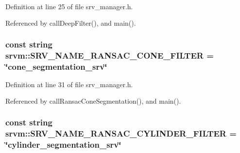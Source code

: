 Definition at line 25 of file srv\-\_\-manager.\-h.



Referenced by call\-Deep\-Filter(), and main().

\hypertarget{namespacesrvm_af2812968f812d475d50a80635965779d}{
\subsubsection[{S\-R\-V\-\_\-\-N\-A\-M\-E\-\_\-\-R\-A\-N\-S\-A\-C\-\_\-\-C\-O\-N\-E\-\_\-\-F\-I\-L\-T\-E\-R}]{\setlength{\rightskip}{0pt plus 5cm}const string srvm\-::\-S\-R\-V\-\_\-\-N\-A\-M\-E\-\_\-\-R\-A\-N\-S\-A\-C\-\_\-\-C\-O\-N\-E\-\_\-\-F\-I\-L\-T\-E\-R = \char`\"{}cone\-\_\-segmentation\-\_\-srv\char`\"{}}}\label{namespacesrvm_af2812968f812d475d50a80635965779d}


Definition at line 31 of file srv\-\_\-manager.\-h.



Referenced by call\-Ransac\-Cone\-Segmentation(), and main().

\hypertarget{namespacesrvm_ae5db0900b3766ce489c65d143ae595b6}{
\subsubsection[{S\-R\-V\-\_\-\-N\-A\-M\-E\-\_\-\-R\-A\-N\-S\-A\-C\-\_\-\-C\-Y\-L\-I\-N\-D\-E\-R\-\_\-\-F\-I\-L\-T\-E\-R}]{\setlength{\rightskip}{0pt plus 5cm}const string srvm\-::\-S\-R\-V\-\_\-\-N\-A\-M\-E\-\_\-\-R\-A\-N\-S\-A\-C\-\_\-\-C\-Y\-L\-I\-N\-D\-E\-R\-\_\-\-F\-I\-L\-T\-E\-R = \char`\"{}cylinder\-\_\-segmentation\-\_\-srv\char`\"{}}}\label{namespacesrvm_ae5db0900b3766ce489c65d143ae595b6}


